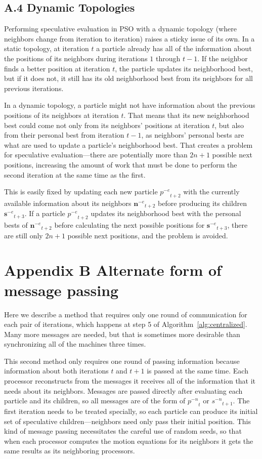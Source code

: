 \documentclass[smallcondensed]{svjour3}
\newcommand{\alg}[1]{Algorithm~\ref{alg:#1}}
\providecommand{\noeval}[1]{\ensuremath{#1^{-e}}}
\providecommand{\nonbest}[1]{\ensuremath{#1^{-n}}}
\providecommand{\p}{\ensuremath{p}}
\providecommand{\s}{\ensuremath{s}}
\providecommand{\sset}{\ensuremath{\mathbf{s}}}
\providecommand{\nset}{\ensuremath{\mathbf{n}}}
\begin{document}
\subsection*{A.4 Dynamic Topologies}

Performing speculative evaluation in PSO with a dynamic topology (where
neighbors change from iteration to iteration) raises a sticky issue of its own.
In a static topology, at iteration $t$ a particle already has all of the
information about the positions of its neighbors during iterations $1$ through
$t-1$.  If the neighbor finds a better position at iteration $t$, the particle
updates its neighborhood best, but if it does not, it still has its old
neighborhood best from its neighbors for all previous iterations.

In a dynamic topology, a particle might not have information about the previous
positions of its neighbors at iteration $t$.  That means that its new
neighborhood best could come not only from its neighbors' positions at
iteration $t$, but also from their personal best from iteration $t-1$, as
neighbors' personal bests are what are used to update a particle's neighborhood
best.  That creates a problem for speculative evaluation---there are
potentially more than $2n+1$ possible next positions, increasing the amount of
work that must be done to perform the second iteration at the same time as the
first.

This is easily fixed by updating each new particle $\noeval{\p}_{t+2}$ with the
currently available information about its neighbors $\noeval{\nset}_{t+2}$
before producing its children $\noeval{\sset}_{t+3}$.  If a particle
$\noeval{\p}_{t+2}$ updates its neighborhood best with the personal bests of
$\noeval{\nset}_{t+2}$ before calculating the next possible positions for
$\noeval{\sset}_{t+3}$, there are still only $2n+1$ possible next positions,
and the problem is avoided.

\section*{Appendix B Alternate form of message passing}

Here we describe a method that requires only one round of communication for
each pair of iterations, which happens at step 5 of \alg{centralized}.  Many
more messages are needed, but that is sometimes more desirable than
synchronizing all of the machines three times.

This second method only requires one round of passing information because
information about both iterations $t$ and $t+1$ is passed at the same time.
Each processor reconstructs from the messages it receives all of the
information that it needs about its neighbors.  Messages are passed directly
after evaluating each particle and its children, so all messages are of the
form of $\nonbest{\p}_t$ or $\nonbest{\s}_{t+1}$.  The first iteration needs to
be treated specially, so each particle can produce its initial set of
speculative children---neighbors need only pass their initial position.  This
kind of message passing necessitates the careful use of random seeds, so that
when each processor computes the motion equations for its neighbors it gets the
same results as its neighboring processors.
\end{document}
